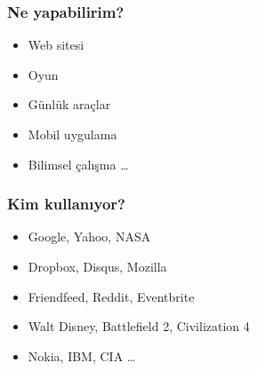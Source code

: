 \documentclass[10pt, compress]{beamer}
\begin{document}


\begin{frame}[fragile]
    \frametitle{Ne yapabilirim?}
    \begin{itemize}[<+- | alert@+>]
        \item Web sitesi
        \item Oyun
        \item Günlük araçlar
        \item Mobil uygulama
        \item Bilimsel çalışma \ldots
    \end{itemize}  
\end{frame}

\begin{frame}[fragile]
    \frametitle{Kim kullanıyor?}
    \begin{itemize}[<+- | alert@+>]
        \item Google, Yahoo, NASA
        \item Dropbox, Disqus, Mozilla
        \item Friendfeed, Reddit, Eventbrite
        \item Walt Disney, Battlefield 2, Civilization 4
        \item Nokia, IBM, CIA \ldots
    \end{itemize}  
\end{frame}



\end{document}
